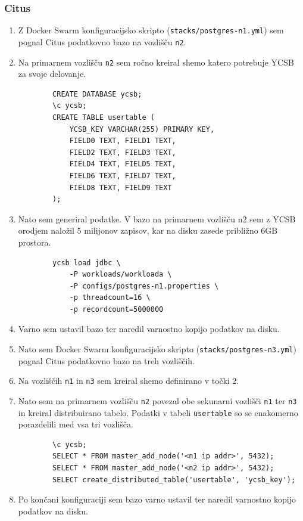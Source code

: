 \documentclass[a4paper, 12pt]{book}
\begin{document}
\subsubsection{Citus}
\begin{enumerate}
    \item Z Docker Swarm konfiguracijsko skripto (\texttt{stacks/postgres-n1.yml}) sem pognal Citus podatkovno bazo na vozlišču \texttt{n2}.
    \item Na primarnem vozlišču \texttt{n2} sem ročno kreiral shemo katero potrebuje YCSB za svoje delovanje.
    \begin{listing}[H]
    \begin{verbatim}
        CREATE DATABASE ycsb;
        \c ycsb;
        CREATE TABLE usertable (
            YCSB_KEY VARCHAR(255) PRIMARY KEY,
            FIELD0 TEXT, FIELD1 TEXT,
            FIELD2 TEXT, FIELD3 TEXT,
            FIELD4 TEXT, FIELD5 TEXT,
            FIELD6 TEXT, FIELD7 TEXT,
            FIELD8 TEXT, FIELD9 TEXT
        );
    \end{verbatim}
    \label{code-ycsb-schema-postgres}
    \end{listing}
    \item Nato sem generiral podatke. V bazo na primarnem vozlišču n2 sem z YCSB orodjem naložil 5 milijonov zapisov, kar na disku zasede približno 6GB prostora.
    \begin{listing}[H]
    \begin{verbatim}
        ycsb load jdbc \
            -P workloads/workloada \
            -P configs/postgres-n1.properties \
            -p threadcount=16 \
            -p recordcount=5000000
    \end{verbatim}
    \label{code-ycsb-load-postgres}
    \end{listing}
    \item Varno sem ustavil bazo ter naredil varnostno kopijo podatkov na disku.
    \item Nato sem Docker Swarm konfiguracijsko skripto (\texttt{stacks/postgres-n3.yml}) pognal Citus podatkovno bazo na treh vozliščih.
    \item Na vozliščih \texttt{n1} in \texttt{n3} sem kreiral shemo definirano v točki 2.
    \item Nato sem na primarnem vozlišču \texttt{n2} povezal obe sekunarni vozlišči \texttt{n1} ter \texttt{n3} in kreiral distribuirano tabelo. Podatki v tabeli \texttt{usertable} so se enakomerno porazdelili med vsa tri vozlišča.
    \begin{listing}[H]
    \begin{verbatim}
        \c ycsb;
        SELECT * FROM master_add_node('<n1 ip addr>', 5432);
        SELECT * FROM master_add_node('<n2 ip addr>', 5432);
        SELECT create_distributed_table('usertable', 'ycsb_key');
    \end{verbatim}
    \label{code-ycsb-add-node-citus}
    \end{listing}
    \item Po končani konfiguraciji sem bazo varno ustavil ter naredil varnostno kopijo podatkov na disku.
\end{enumerate}
\end{document}
